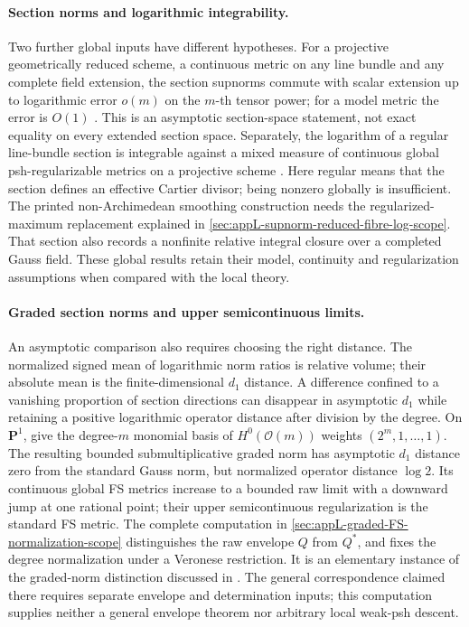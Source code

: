 \paragraph{Section norms and logarithmic integrability.}
Two further global inputs have different hypotheses.
For a projective geometrically reduced scheme, a continuous metric
on any line bundle and any complete field extension, the section
supnorms commute with scalar extension up to logarithmic error
\(o(m)\) on the \(m\)-th tensor power; for a model metric the error
is \(O(1)\) \cite[Theorem~6.6]{BE21}.  This is an asymptotic
section-space statement, not exact equality on every extended section
space.  Separately, the logarithm of a regular line-bundle section
is integrable against a mixed measure of continuous global
psh-regularizable metrics on a projective scheme
\cite[Theorem~8.12]{BE21}.  Here regular means that the section
defines an effective Cartier divisor; being nonzero globally is
insufficient.  The printed non-Archimedean smoothing construction
needs the regularized-maximum replacement explained in
\cref{sec:appL-supnorm-reduced-fibre-log-scope}.  That section also
records a nonfinite relative integral closure over a completed
Gauss field.  These global results retain their model, continuity
and regularization assumptions when compared with the local theory.

\paragraph{Graded section norms and upper semicontinuous limits.}
An asymptotic comparison also requires choosing the right distance.
The normalized signed mean of logarithmic norm ratios is relative
volume; their absolute mean is the finite-dimensional \(d_1\)
distance. A difference confined to a vanishing proportion of section
directions can disappear in asymptotic \(d_1\) while retaining a
positive logarithmic operator distance after division by the degree.
On \(\mathbf P^1\), give the degree-\(m\) monomial basis of
\(H^0(\mathcal O(m))\) weights \((2^m,1,\ldots,1)\).
The resulting bounded submultiplicative graded norm has asymptotic
\(d_1\) distance zero from the standard Gauss norm, but normalized
operator distance \(\log 2\). Its continuous global FS metrics
increase to a bounded raw limit with a downward jump at one rational
point; their upper semicontinuous regularization is the standard
FS metric. The complete computation in
\cref{sec:appL-graded-FS-normalization-scope} distinguishes the raw
envelope \(Q\) from \(Q^*\), and fixes the degree normalization
under a Veronese restriction. It is an elementary instance of the
graded-norm distinction discussed in \cite[Section~3.2]{Reb20AsymptoticFSV1}.
The general correspondence claimed there requires separate
envelope and determination inputs; this computation supplies neither
a general envelope theorem nor arbitrary local weak-psh descent.

